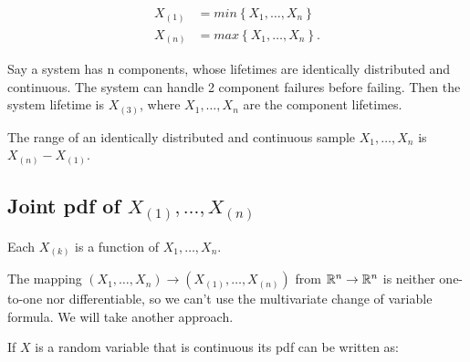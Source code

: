 \begin{eg}
	\begin{align*}
		X_{\left( 1 \right) } &= min\left\{ X_{1} , \ldots , X_{n} \right\} \\
		X_{\left( n \right) } &= max\left\{ X_{1} , \ldots , X_{n} \right\}  
	.\end{align*}
\end{eg}
\begin{eg}
	Say a system has n components, whose lifetimes are identically distributed and continuous. The system can handle 2 component failures before failing. Then the system lifetime is $X_{\left( 3 \right) }$, where $X_{1} , \ldots , X_{n}$ are the component lifetimes.
\end{eg}
\begin{eg}
	The range of an identically distributed and continuous sample $X_{1} , \ldots , X_{n}$ is $X_{\left( n \right) } - X_{\left( 1 \right) }$. 
\end{eg}
\subsection{Joint pdf of $X_{\left( 1 \right) }, \ldots, X_{\left( n \right) }$ }
Each $X_{\left( k \right)}$ is a function of $X_{1} , \ldots , X_{n}$. 

The mapping $\left( X_{1} , \ldots , X_{n} \right) \to \left( X_{\left( 1 \right) } ,\ldots, X_{\left( n \right) } \right) $ from $\mathbb{R}^{n}\to \mathbb{R}^{n}$ is neither one-to-one nor differentiable, so we can't use the multivariate change of variable formula. We will take another approach. 

If $X$ is a random variable that is continuous its pdf can be written as:
